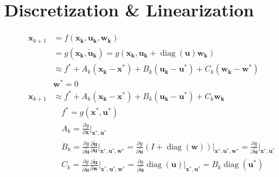\documentclass[11pt]{article}
\DeclareMathOperator{\diag}{\operatorname{diag}}%
\newcommand{\pd}[2]{\frac{\partial #1}{\partial #2}} %
\begin{document}
\section{Discretization \& Linearization}
\begin{align*}
    \mathbf{x}_{k+1} &= f(\mathbf{x_k}, \mathbf{u_k}, \mathbf{w_k}) \\
    &= g(\mathbf{x_k}, \mathbf{\tilde{u}_k}) = g(\mathbf{x_k}, \mathbf{u_k} + \diag(\mathbf{u}) \mathbf{w_k}) \\
    &\approx f^* + A_k(\mathbf{x_k} - \mathbf{x^*}) + B_k(\mathbf{u_k} - \mathbf{u^*}) + C_k(\mathbf{w_k} - \mathbf{w^*}) \\
    &\mathbf{w^*} = 0 \\
    \mathbf{x}_{k+1} &\approx f^* + A_k(\mathbf{x_k} - \mathbf{x^*}) + B_k(\mathbf{u_k} - \mathbf{u^*}) + C_k \mathbf{w_k} \\
    &\quad f^* = g(\mathbf{x^*}, \mathbf{u^*}) \\
    &\quad A_k = \pd{g}{\mathbf{x}}\bigg|_{\mathbf{x^*}, \mathbf{u^*}} \\
    &\quad B_k = \pd{g}{\mathbf{\tilde{u}}} \pd{\mathbf{\tilde{u}}}{\mathbf{u}}\bigg|_{\mathbf{x^*}, \mathbf{u^*}, \mathbf{w^*}} = \pd{g}{\mathbf{\tilde{u}}} \left(I + \diag(\mathbf{w})\right)\bigg|_{\mathbf{x^*}, \mathbf{u^*}, \mathbf{w^*}} = \pd{g}{\mathbf{\tilde{u}}}\bigg|_{\mathbf{x^*}, \mathbf{u^*}} \\
    &\quad C_k = \pd{g}{\mathbf{\tilde{u}}} \pd{\mathbf{\tilde{u}}}{\mathbf{w}}\bigg|_{\mathbf{x^*}, \mathbf{u^*}, \mathbf{w^*}} = \pd{g}{\mathbf{\tilde{u}}} \diag(\mathbf{u})\bigg|_{\mathbf{x^*}, \mathbf{u^*}} = B_k \diag(\mathbf{u^*})
\end{align*}
\end{document}
